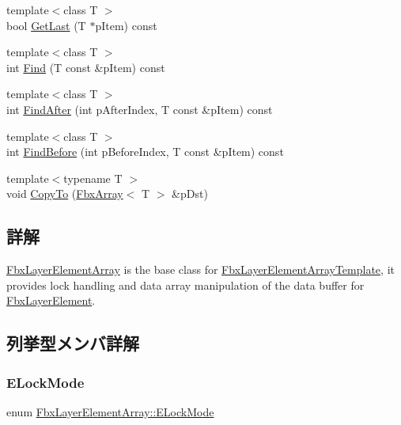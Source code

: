 \begin{DoxyCompactItemize}
\item 
{\footnotesize template$<$class T $>$ }\\bool \hyperlink{class_fbx_layer_element_array_a151426ccb1c4c28550c637716fdb7b64}{Get\+Last} (T $\ast$p\+Item) const
\item 
{\footnotesize template$<$class T $>$ }\\int \hyperlink{class_fbx_layer_element_array_a8dcc42ae3b8a351a1d5204a416fe72de}{Find} (T const \&p\+Item) const
\item 
{\footnotesize template$<$class T $>$ }\\int \hyperlink{class_fbx_layer_element_array_a6f33a669f8e1d538ff753db1b9378dcc}{Find\+After} (int p\+After\+Index, T const \&p\+Item) const
\item 
{\footnotesize template$<$class T $>$ }\\int \hyperlink{class_fbx_layer_element_array_a4fa63bc33b1de09a7d1b8be32b84b06c}{Find\+Before} (int p\+Before\+Index, T const \&p\+Item) const
\item 
{\footnotesize template$<$typename T $>$ }\\void \hyperlink{class_fbx_layer_element_array_a64ddf869251ef992f995a5bb9c16efcc}{Copy\+To} (\hyperlink{class_fbx_array}{Fbx\+Array}$<$ T $>$ \&p\+Dst)
\end{DoxyCompactItemize}


\subsection{詳解}
\hyperlink{class_fbx_layer_element_array}{Fbx\+Layer\+Element\+Array} is the base class for \hyperlink{class_fbx_layer_element_array_template}{Fbx\+Layer\+Element\+Array\+Template}, it provides lock handling and data array manipulation of the data buffer for \hyperlink{class_fbx_layer_element}{Fbx\+Layer\+Element}. 

\subsection{列挙型メンバ詳解}
\mbox{\label{class_fbx_layer_element_array_a8968b1fb337f924d0e9ca87302b54d70}} 
\subsubsection{\texorpdfstring{E\+Lock\+Mode}{ELockMode}}
{\footnotesize\ttfamily enum \hyperlink{class_fbx_layer_element_array_a8968b1fb337f924d0e9ca87302b54d70}{Fbx\+Layer\+Element\+Array\+::\+E\+Lock\+Mode}}

